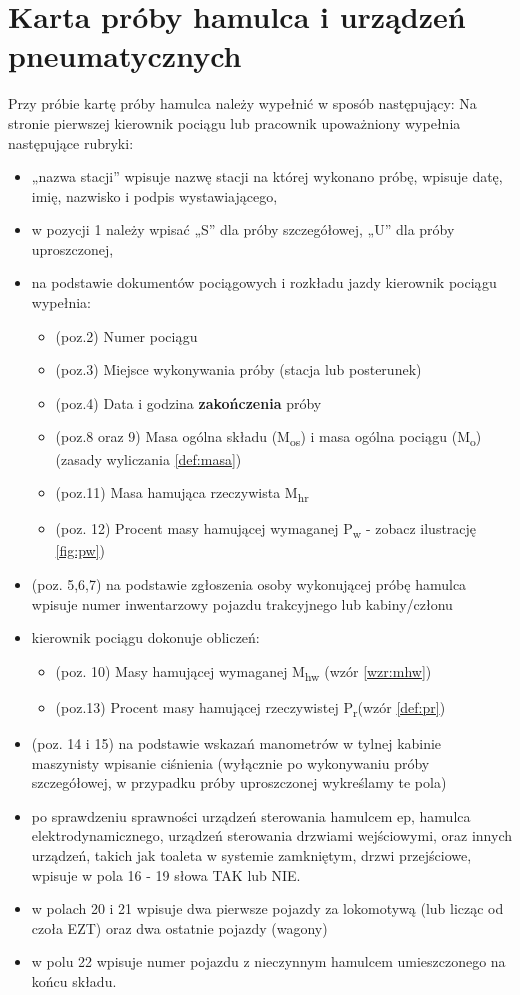 \section{Karta próby hamulca i urządzeń pneumatycznych}
Przy próbie kartę próby hamulca należy wypełnić w sposób następujący:
Na stronie pierwszej kierownik pociągu lub pracownik upoważniony wypełnia następujące rubryki:
\begin{itemize}
	\item „nazwa stacji” wpisuje nazwę stacji na której wykonano próbę, wpisuje datę, imię, nazwisko i podpis wystawiającego,
	\item w pozycji 1 należy wpisać „S” dla próby szczegółowej, „U” dla próby uproszczonej,
	\item na podstawie dokumentów pociągowych i rozkładu jazdy kierownik pociągu wypełnia:
	\begin{itemize}
		\item (poz.2) Numer pociągu
		\item (poz.3) Miejsce wykonywania próby (stacja lub posterunek)
		\item (poz.4) Data i godzina \textbf{zakończenia} próby
		\item (poz.8 oraz 9) Masa ogólna składu (M\textsubscript{os}) i masa ogólna pociągu (M\textsubscript{o}) (zasady wyliczania \ref{def:masa})
		\item (poz.11) Masa hamująca rzeczywista M\textsubscript{hr}
		\item (poz. 12) Procent masy hamującej wymaganej P\textsubscript{w} - zobacz ilustrację \ref{fig:pw})
	\end{itemize}
	\item (poz. 5,6,7) na podstawie zgłoszenia osoby wykonującej próbę hamulca  wpisuje numer inwentarzowy pojazdu trakcyjnego lub kabiny/członu
	\item kierownik pociągu dokonuje obliczeń:
		\begin{itemize}
			\item (poz. 10) Masy hamującej wymaganej M\textsubscript{hw} (wzór \ref{wzr:mhw})
			\item (poz.13) Procent masy hamującej rzeczywistej P\textsubscript{r}(wzór \ref{def:pr})
		\end{itemize}
	\item (poz. 14 i 15) na podstawie wskazań manometrów w tylnej kabinie maszynisty wpisanie ciśnienia (wyłącznie po wykonywaniu próby szczegółowej, w przypadku próby uproszczonej wykreślamy te pola)
	\item po sprawdzeniu sprawności urządzeń sterowania hamulcem ep, hamulca elektrodynamicznego, urządzeń sterowania drzwiami wejściowymi, oraz innych urządzeń, takich jak toaleta w systemie zamkniętym, drzwi przejściowe, wpisuje w pola 16 - 19 słowa TAK lub NIE.
	\item w polach 20 i 21 wpisuje dwa pierwsze pojazdy za lokomotywą (lub licząc od czoła EZT) oraz dwa ostatnie pojazdy (wagony)
	\item w polu 22 wpisuje numer pojazdu z nieczynnym hamulcem umieszczonego na końcu składu.	
\end{itemize}

